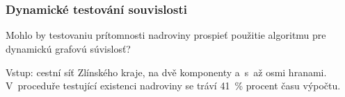 \documentclass[10pt]{beamer}
\begin{document}
\section{}

\begin{frame}
	\frametitle{Dynamické testování souvislosti}

	\begin{block}{Mohlo by testovaniu prítomnosti nadroviny prospieť použitie algoritmu pre dynamickú grafovú súvislosť?}

	Vstup: cestní síť Zlínského kraje, na dvě komponenty a~s~až osmi hranami. V~proceduře testující existenci nadroviny se tráví 41~\% procent času výpočtu.

	\end{block}

\end{frame}
\end{document}

